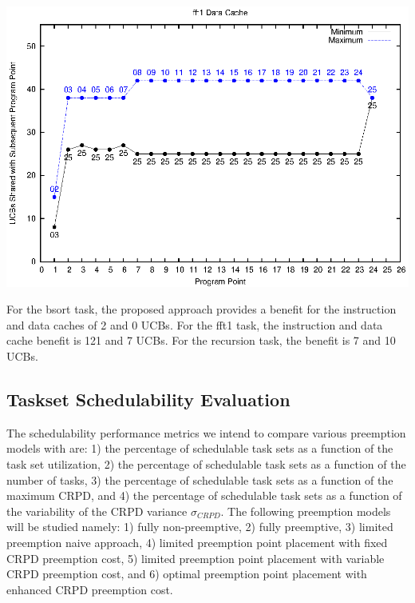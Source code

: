 \begin{center}
  \includegraphics[width=\linewidth]{eps/fft1-dcache.eps}
\end{center}

For the bsort task, the proposed approach provides a benefit for the
instruction and data caches of 2 and 0 UCBs. For the fft1 task, the
instruction and data cache benefit is 121 and 7 UCBs. For the
recursion task, the benefit is 7 and 10 UCBs.


\subsection {Taskset Schedulability Evaluation}\label{sec:taskset schedulability}
The schedulability performance metrics we intend to compare various
preemption models with are: 1) the percentage of schedulable task sets
as a function of the task set utilization, 2) the percentage of
schedulable task sets as a function of the number of tasks, 3) the
percentage of schedulable task sets as a function of the maximum CRPD,
and 4) the percentage of schedulable task sets as a function of the
variability of the CRPD variance \begin{math}\sigma_{CRPD}\end{math}.
The following preemption models will be studied namely: 1) fully
non-preemptive, 2) fully preemptive, 3) limited preemption naive
approach, 4) limited preemption point placement with fixed CRPD
preemption cost, 5) limited preemption point placement with variable
CRPD preemption cost, and 6) optimal preemption point placement with
enhanced CRPD preemption cost. 

